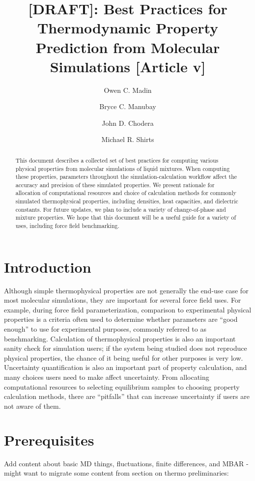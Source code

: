 \documentclass[9pt,bestpractices]{livecoms}
\title{[DRAFT]: Best Practices for Thermodynamic Property Prediction from Molecular Simulations [Article v\versionnumber]}
\author[1]{Owen C. Madin}
\author[1]{Bryce C. Manubay}
\author[2]{John D. Chodera}
\author[1*]{Michael R. Shirts}
\affil[1]{University of Colorado Boulder}
\affil[2]{Sloan Kettering Institute}
\begin{document}
\begin{frontmatter}
\maketitle

\begin{abstract}
This document describes a collected set of best practices for computing various physical properties from molecular simulations of liquid mixtures.  When computing these properties, parameters throughout the simulation-calculation workflow affect the accuracy and precision of these simulated properties. We present rationale for allocation of computational resources and choice of calculation methods for commonly simulated thermophysical properties, including densities, heat capacities, and dielectric constants.  For future updates, we plan to include a variety of change-of-phase and mixture properties.  We hope that this document will be a useful guide for a variety of uses, including force field benchmarking.
\end{abstract}

\end{frontmatter}




\section{Introduction}

Although simple thermophysical properties are not generally the end-use case for most molecular simulations, they are important for several force field uses.  For example, during force field parameterization, comparison to experimental physical properties is a criteria often used to determine whether parameters are ``good enough'' to use for experimental purposes, commonly referred to as benchmarking.  Calculation of thermophysical properties is also an important sanity check for simulation users; if the system being studied does not reproduce physical properties, the chance of it being useful for other purposes is very low. Uncertainty quantification is also an important part of property calculation, and many choices users need to make affect uncertainty.  From allocating computational resources to selecting equilibrium samples to choosing property calculation methods, there are ``pitfalls'' that can increase uncertainty if users are not aware of them.

\section{Prerequisites}
Add content about basic MD things, fluctuations, finite differences, and MBAR - might want to migrate some content from section on thermo preliminaries:
\end{document}
